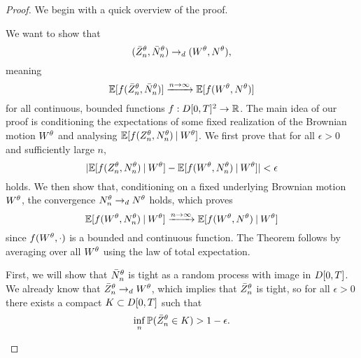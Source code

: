 \begin{proof}



We begin with a quick overview of the proof.

We want to show that
\begin{equation}
(\bar{Z}^{\theta}_n, \bar{N}_n^{\theta}) \rightarrow_d (W^{\theta}, N^{\theta}),
\end{equation}
meaning 
\begin{equation}
\mathbb{E}[f(\bar{Z}^{\theta}_n, \bar{N}_n^{\theta})] \xrightarrow{n \rightarrow \infty} \mathbb{E}[f(W^{\theta}, N^{\theta})]
\end{equation}
for all continuous, bounded functions $f:D[0,T]^2\rightarrow\mathbb{R}$.
The main idea of our proof is conditioning the expectations of some fixed realization of the Brownian motion $W^{\theta}$ and analysing  $\mathbb{E}[f(Z_n^{\theta}, N_n^{\theta}) \: | \: W^{\theta}]$.
We first prove that for all $\epsilon > 0$ and sufficiently large $n$,
\begin{equation}
	| \mathbb{E}[f(Z_n^{\theta}, N_n^{\theta}) \: | \: W^{\theta}] -  \mathbb{E}[f(W^{\theta}, N_n^{\theta}) \: | \: W^{\theta}] | < \epsilon
\end{equation}
holds.
We then show that, conditioning on a fixed underlying Brownian motion $W^{\theta}$, the convergence $N_n^{\theta} \rightarrow_d N^{\theta}$ holds,
which proves
\begin{equation}
	\mathbb{E}[f(W^{\theta}, N_n^{\theta}) \: | \: W^{\theta}] \xrightarrow{n \rightarrow \infty} \mathbb{E}[f(W^{\theta}, N^{\theta} ) \: | \: W^{\theta}]
\end{equation}
since $f(W^{\theta}, \cdot)$ is a bounded and continuous function.
The Theorem follows by averaging over all $W^{\theta}$ using the law of total expectation.


\begin{proofpart}
First, we will show that $\bar{N}_n^{\theta}$ is tight as a random process with image in $D[0, T]$.
We already know that $\bar{Z}^{\theta}_n \rightarrow_d W^{\theta}$, which implies that $\bar{Z}^{\theta}_n$ is tight, 
so for all $\epsilon>0$ there exists a compact $K \subset D[0, T]$ such that
\begin{equation} \label{E: rznt tight}
\inf_n \mathbb{P} ( \bar{Z}^{\theta}_n \in K) > 1 - \epsilon.
\end{equation}


\end{proofpart}
\end{proof}

